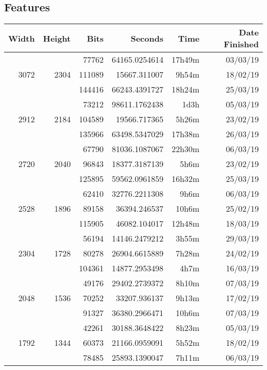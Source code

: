 \subsection{Features}
  \begin{center}
  \begin{tabular}{ r r r | r r r }
  Width & Height & Bits & Seconds & Time & Date Finished \\ \hline
  \multirow{3}{*}{3072} & \multirow{3}{*}{2304} & 77762 & 64165.0254614 & 17h49m & 03/03/19 \\
  & & 111089 & 15667.311007 & 9h54m & 18/02/19 \\
  & & 144416 & 66243.4391727 & 18h24m & 25/03/19 \\
  \hline
  \multirow{3}{*}{2912} & \multirow{3}{*}{2184} & 73212 & 98611.1762438 & 1d3h & 05/03/19 \\
  & & 104589 & 19566.717365 & 5h26m & 23/02/19 \\
  & & 135966 & 63498.5347029 & 17h38m & 26/03/19 \\
  \hline
  \multirow{3}{*}{2720} & \multirow{3}{*}{2040} & 67790 & 81036.1087067 & 22h30m & 06/03/19 \\
  & & 96843 & 18377.3187139 & 5h6m & 23/02/19 \\
  & & 125895 & 59562.0961859 & 16h32m & 25/03/19 \\
  \hline
  \multirow{3}{*}{2528} & \multirow{3}{*}{1896} & 62410 & 32776.2211308 & 9h6m & 06/03/19 \\
  & & 89158 & 36394.246537 & 10h6m & 25/02/19 \\
  & & 115905 & 46082.104017 & 12h48m & 18/03/19 \\
  \hline
  \multirow{3}{*}{2304} & \multirow{3}{*}{1728} & 56194 & 14146.2479212 & 3h55m & 29/03/19 \\
  & & 80278 & 26904.6615889 & 7h28m & 24/02/19 \\
  & & 104361 & 14877.2953498 & 4h7m & 16/03/19 \\
  \hline
  \multirow{3}{*}{2048} & \multirow{3}{*}{1536} & 49176 & 29402.2739372 & 8h10m & 07/03/19 \\
  & & 70252 & 33207.936137 & 9h13m & 17/02/19 \\
  & & 91327 & 36380.2966471 & 10h6m & 07/03/19 \\
  \hline
  \multirow{3}{*}{1792} & \multirow{3}{*}{1344} & 42261 & 30188.3648422 & 8h23m & 05/03/19 \\
  & & 60373 & 21166.0959091 & 5h52m & 18/02/19 \\
  & & 78485 & 25893.1390047 & 7h11m & 06/03/19 \\

\end{tabular}
\end{center}
